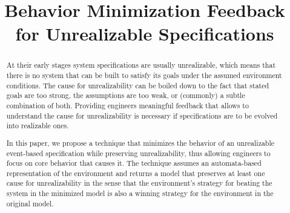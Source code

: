 \documentclass[sigconf,review,anonymous]{acmart}
\begin{document}

\title{Behavior Minimization Feedback for Unrealizable  
Specifications }


\author{
	\and
}
%




\begin{abstract}
At their early stages system specifications are usually unrealizable, which means that there is no system that can be built to satisfy its goals under
the assumed environment conditions. The cause for unrealizability can be
boiled down to the fact that stated goals are too strong, the assumptions are
too weak, or (commonly) a subtle combination of both.  Providing engineers meaningful
feedback that allows to understand the cause for unrealizability is
necessary if specifications are to be evolved into realizable ones.

In this paper, we propose a technique that minimizes the behavior of an
unrealizable event-based \gr specification while preserving 
unrealizability, thus allowing
engineers to focus on core behavior that causes it. The technique assumes an automata-based representation of the environment
and returns a model that preserves at least one cause for 
unrealizability in the sense 
that the environment's strategy for beating the system in 
the minimized model is also a 
winning strategy for the environment in the original model. 

\end{abstract}
\end{document}
